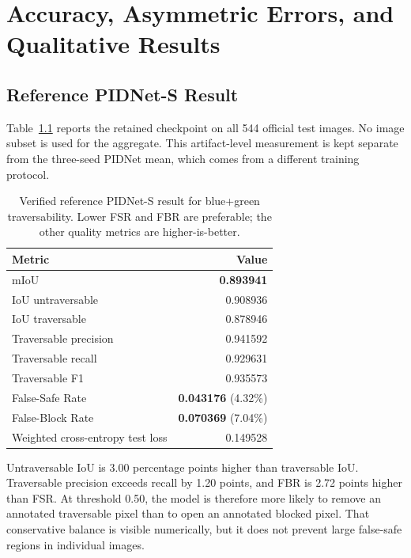 \chapter{Accuracy, Asymmetric Errors, and Qualitative Results}
\label{ch:results}

\section{Reference PIDNet-S Result}

Table~\ref{tab:frozen_pidnet_result} reports the retained checkpoint on all 544
official test images. No image subset is used for the aggregate. This
artifact-level measurement is kept separate from the three-seed PIDNet mean,
which comes from a different training protocol.

\begin{table}[H]
\centering
\caption{Verified reference PIDNet-S result for blue+green traversability. Lower
FSR and FBR are preferable; the other quality metrics are higher-is-better.}
\label{tab:frozen_pidnet_result}
\begin{tabular}{@{}lr@{}}
\toprule
\textbf{Metric} & \textbf{Value} \\
\midrule
mIoU & \textbf{0.893941} \\
IoU untraversable & 0.908936 \\
IoU traversable & 0.878946 \\
Traversable precision & 0.941592 \\
Traversable recall & 0.929631 \\
Traversable F1 & 0.935573 \\
False-Safe Rate & \textbf{0.043176} (4.32\%) \\
False-Block Rate & \textbf{0.070369} (7.04\%) \\
Weighted cross-entropy test loss & 0.149528 \\
\bottomrule
\end{tabular}
\end{table}

Untraversable IoU is 3.00 percentage points higher than traversable IoU.
Traversable precision exceeds recall by 1.20 points, and FBR is 2.72 points
higher than FSR. At threshold 0.50, the model is therefore more likely to
remove an annotated traversable pixel than to open an annotated blocked pixel.
That conservative balance is visible numerically, but it does not prevent
large false-safe regions in individual images.

